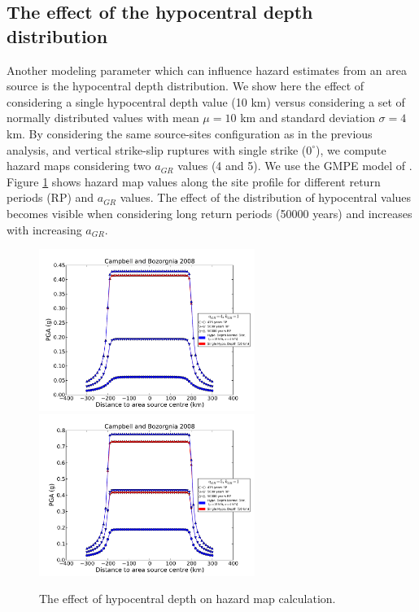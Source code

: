 \subsection{The effect of the hypocentral depth distribution}
Another modeling parameter which can influence hazard estimates from an area source is the hypocentral
depth distribution. We show here the effect of considering a single hypocentral depth value (10 km) versus
considering a set of normally distributed values with mean $\mu=10$ km and standard deviation $\sigma=4$ km. By considering the same source-sites configuration as in the previous analysis, and vertical
strike-slip ruptures with single strike ($0^{\circ}$), we compute hazard maps considering two $a_{GR}$ values (4 and 5). We use the GMPE model of \citet{campbell2008}. Figure \ref{fig:hypo_depth_area} shows hazard map values along the site profile for different
return periods (RP) and $a_{GR}$ values. The effect of the distribution of hypocentral values becomes visible when considering long return periods (50000 years) and increases with increasing $a_{GR}$.
\begin{figure}
\centering
\includegraphics[width=7cm]{./Pictures/PGA_a4_CB2008_hypo_depth.pdf}
\includegraphics[width=7cm]{./Pictures/PGA_a5_CB2008_hypo_depth.pdf}
\caption{The effect of hypocentral depth on hazard map calculation.}
\label{fig:hypo_depth_area}
\end{figure}


